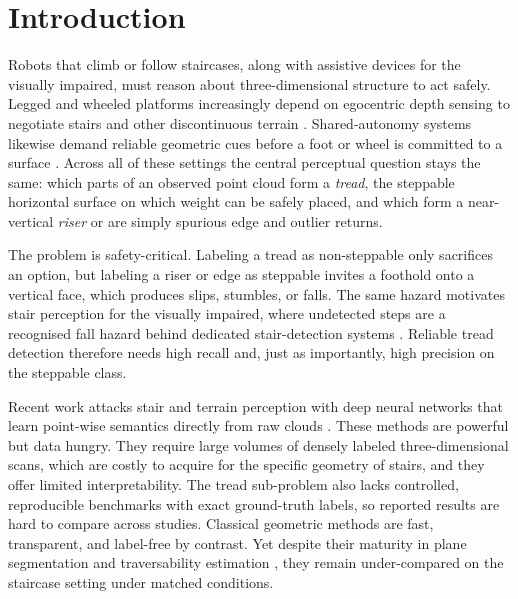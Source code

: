 \section{Introduction}
Robots that climb or follow staircases, along with assistive devices for
the visually impaired, must reason about three-dimensional structure to
act safely. Legged and wheeled platforms increasingly depend on
egocentric depth sensing to negotiate stairs and other discontinuous
terrain \cite{agarwal2022legged,belter2016adaptive,stelzer2012stereo}.
Shared-autonomy systems likewise demand reliable geometric cues before a
foot or wheel is committed to a surface \cite{marion2017director}. Across
all of these settings the central perceptual question stays the same:
which parts of an observed point cloud form a \emph{tread}, the steppable
horizontal surface on which weight can be safely placed, and which form a
near-vertical \emph{riser} or are simply spurious edge and outlier
returns.

The problem is safety-critical. Labeling a tread as non-steppable only
sacrifices an option, but labeling a riser or edge as steppable invites a
foothold onto a vertical face, which produces slips, stumbles, or falls.
The same hazard motivates stair perception for the visually impaired,
where undetected steps are a recognised fall hazard behind dedicated
stair-detection systems \cite{matsumura2022deep}. Reliable tread
detection therefore needs high recall and, just as importantly, high
precision on the steppable class.

Recent work attacks stair and terrain perception with deep neural
networks that learn point-wise semantics directly from raw clouds
\cite{qi2016pointnet,matsumura2022deep}. These methods are powerful but
data hungry. They require large volumes of densely labeled
three-dimensional scans, which are costly to acquire for the specific
geometry of stairs, and they offer limited interpretability. The tread
sub-problem also lacks controlled, reproducible benchmarks with exact
ground-truth labels, so reported results are hard to compare across
studies. Classical geometric methods are fast, transparent, and
label-free by contrast. Yet despite their maturity in plane segmentation
and traversability estimation
\cite{chavezgarcia2017learning,gomes2023survey}, they remain
under-compared on the staircase setting under matched conditions.

